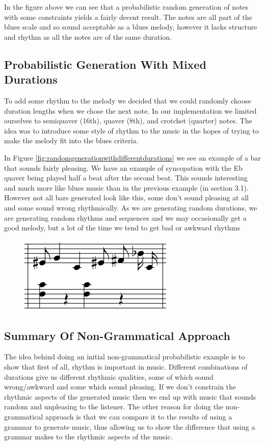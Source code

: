 \documentclass[pdftex,12pt,a4paper]{report}
\begin{document}
In the figure above we can see that a probabilistic random generation of notes with some constraints yields a fairly decent result. The notes are all part of the blues scale and so sound acceptable as a blues melody, however it lacks structure and rhythm as all the notes are of the same duration. 

\subsection{Probabilistic Generation With Mixed Durations}
To add some rhythm to the melody we decided that we could randomly choose duration lengths when we chose the next note. In our implementation we limited ourselves to semiquaver (16th), quaver (8th), and crotchet (quarter) notes. The idea was to introduce some style of rhythm to the music in the hopes of trying to make the melody fit into the blues criteria.

In Figure \ref{fig:randomgenerationwithdifferentdurations} we see an example of a bar that sounds fairly pleasing. We have an example of syncopation with the Eb quaver being played half a beat after the second beat. This sounds interesting and much more like blues music than in the previous example (in section 3.1). However not all bars generated look like this, some don't sound pleasing at all and some sound wrong rhythmically. As we are generating random durations, we are generating random rhythms and sequences and we may occasionally get a good melody, but a lot of the time we tend to get bad or awkward rhythms

\begin{figure}[here]
  \centering
  \includegraphics[scale=0.6]{figure/randomgenerationdifferentdurations.png}
  \label{fig:probabilisticgenerationwithdifferentdurations}
\end{figure}

\subsection{Summary Of Non-Grammatical Approach}
The idea behind doing an initial non-grammatical probabilistic example is to show that first of all, rhythm is important in music. Different combinations of durations give us different rhythmic qualities, some of which sound wrong/awkward and some which sound pleasing. If we don't constrain the rhythmic aspects of the generated music then we end up with music that sounds random and unpleasing to the listener.
The other reason for doing the non-grammatical approach is that we can compare it to the results of using a grammar to generate music, thus allowing us to show the difference that using a grammar makes to the rhythmic aspects of the music.
\end{document}
